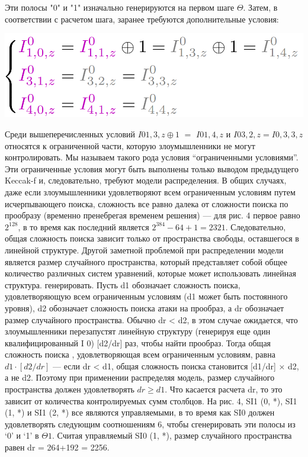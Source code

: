 \documentclass[utf8,14pt,a4paper,oneside,russian]{book}
\begin{document}
Эти полосы "0" и "1" изначально генерируются на первом шаге $\Theta$. Затем,
в соответствии с расчетом шага, заранее требуются дополнительные условия:

\begin{center}
    \includegraphics*[scale=0.45]{13}
\end{center}

Среди вышеперечисленных условий $I0 1,3,z \oplus 1$ $=$ $I0 1,4,z$ и $I0 3,2,z = I0, 3,3,z$ относятся к
ограниченной части, которую злоумышленники не могут контролировать. Мы называем такого рода условия
“ограниченными условиями”. Эти ограниченные условия могут быть выполнены только
выводом предыдущего Keccak-f и, следовательно, требуют модели распределения. В общих
случаях, даже если злоумышленники удовлетворяют всем ограниченным условиям путем исчерпывающего поиска,
сложность все равно далека от сложности поиска по прообразу (временно пренебрегая временем
решения) — для рис. 4 первое равно $2^{128}$, в то время как последний является $2^{384}
    -64+1 = 2321$. Следовательно, общая сложность поиска зависит только от
пространства свободы, оставшегося в линейной структуре.
Другой заметной проблемой при распределении модели является размер случайного пространства,
который представляет собой общее количество различных систем уравнений, которые может использовать линейная структура.
генерировать. Пусть d1 обозначает сложность поиска, удовлетворяющую всем ограниченным условиям (d1 может быть постоянного уровня), d2 обозначает сложность поиска
атаки на прообраз, а dr обозначает размер случайного пространства. Обычно dr < d2, в этом случае
ожидается, что злоумышленники перезапустят линейную структуру (генерируя еще один квалифицированный I
0) [d2/dr] раз, чтобы найти прообраз. Тогда общая сложность поиска
, удовлетворяющая всем ограниченным условиям, равна $d1 \cdot [d2/dr]$ — если dr < d1, общая сложность поиска становится [d1/dr] × d2, а не d2. Поэтому при применении
распределяя модель, размер случайного пространства должен удовлетворять $dr \geq d1$.
Что касается расчета dr, то это зависит от количества контролируемых
сумм столбцов. На рис. 4, SI1 (0, *), SI1 (1, *) и SI1 (2, *) все являются управляемыми, в то время как SI0
должен удовлетворять следующим соотношениям 6, чтобы сгенерировать эти полосы из ‘0’ и ‘1’ в $\Theta1$.
Считая управляемый SI0 (1, *), размер случайного пространства равен dr = 264+192 = 2256.
\end{document}
